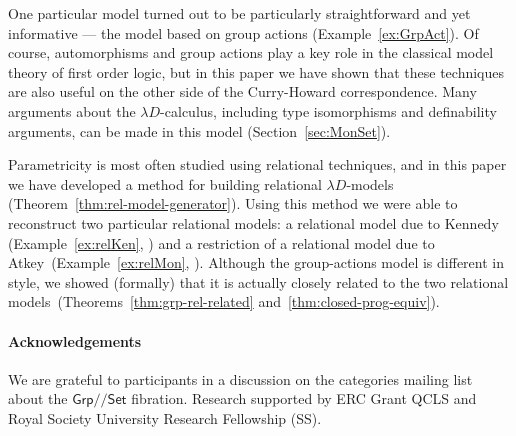 \documentclass[a4paper,UKenglish]{lipics}
\theoremstyle{plain}
\newcommand{\msf}[1]{\mathsf{#1}} %
\newcommand{\Grp}{\msf{Grp}}
\newcommand{\Set}{\msf{Set}}
\newcommand{\Lslice}[1]{#1/\!/\Set}
\newcommand{\GrpSet}{\Lslice{\Grp}}
\begin{document}
One particular model turned out to be particularly straightforward and yet informative --- the model based on group actions (Example~\ref{ex:GrpAct}). Of course, automorphisms and group actions play a key role in the classical model theory of first order logic, but in this paper we have shown that these techniques are also useful on the other side of the Curry-Howard correspondence. Many arguments about the $\lambda D$-calculus, including type isomorphisms and definability arguments, can be made in this model (Section~\ref{sec:MonSet}).

Parametricity is most often studied using relational techniques, and in this paper we have developed a method for building relational $\lambda D$-models (Theorem~\ref{thm:rel-model-generator}). Using this method we were able to reconstruct two particular relational models: a relational model due to Kennedy (Example~\ref{ex:relKen}, \cite{Kennedy:1997:RPU:263699.263761}) and a restriction of a relational model due to Atkey~(Example~\ref{ex:relMon}, \cite{atkey14conservation}). Although the group-actions model is different in style, we showed (formally) that it is actually closely related to the two relational models~(Theorems~\ref{thm:grp-rel-related} and~\ref{thm:closed-prog-equiv}).


\paragraph*{Acknowledgements}
We are grateful to participants in a discussion on the categories mailing list
about the $\GrpSet$ fibration.
Research supported by
ERC Grant QCLS and Royal Society University Research Fellowship (SS).


\end{document}
